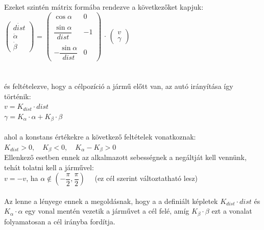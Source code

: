Ezeket szintén mátrix formába rendezve a következőket kapjuk:\\

\( \begin{pmatrix}
	\dot{dist}\\
	\dot{\alpha}\\
	\dot{\beta}
\end{pmatrix} \)
=
\( \begin{pmatrix}
	\cos\alpha & 0\\\\
	\dfrac{\sin\alpha}{dist} & -1\\\\
	-\dfrac{\sin\alpha}{dist} & 0
\end{pmatrix} \)
$ \cdot $ 
\( \begin{pmatrix}
	v\\
	\gamma
\end{pmatrix} \)
\\\\\\
és feltételezve, hogy a célpozíció a jármű előtt van, az autó irányítása így történik:\\

$ v = K_{dist} \cdot dist $\\

$ \gamma = K_\alpha \cdot \alpha + K_\beta \cdot \beta $\\\\
ahol a konstans értékekre a következő feltételek vonatkoznak: $ K_{dist} > 0, \quad K_\beta < 0, \quad K_\alpha - K_\beta > 0  $\\
Ellenkező esetben ennek az alkalmazott sebességnek a negáltját kell vennünk, tehát tolatni kell a járművel:\\

$ v = -v $, \qquad ha $\alpha \not\in \left(-\dfrac{\pi}{2}, \dfrac{\pi}{2} \right) \quad $ (ez cél szerint változtatható lesz)\\\\
Az lenne a lényege ennek a megoldásnak, hogy a a definiált képletek $ K_{dist} \cdot dist $ és $ K_\alpha \cdot \alpha $ egy vonal mentén vezetik a járművet a cél felé, amíg $ K_\beta \cdot \beta $ ezt a vonalat folyamatosan a cél irányba fordítja.

